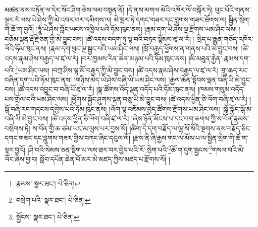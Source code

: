 མཚན་ནས་བཏོན་ལ་དེར་སོང་ཤིག་ཅེས་ལམ་བསྟན་ནོ། །དེ་ནས་མགལ་མེའི་འཁོར་ལོ་བསྐོར་ཏེ། ཕུང་པོའི་གནས་ལྔར་རཾ་ལས་ཡེ་ཤེས་ཀྱི་མེ་འབར་བར་དམིགས་ལ། མེ་སྦར་ཏེ་དགང་གཟར་དང་བླུགས་གཟར་ཐོགས་ལ། སྦྱིན་སྲེག་གི་ཆོ་ག་བྱའོ། །ཧཱུཾ་ཡེ་ཤེས་ཀློང་ཡངས་འཁྱིལ་པའི་ཧོམ་ཁུང་ནས། །རྣམ་དག་ཡེ་ཤེས་ལྔ་རྫོགས་ཡམ་ཤིང་ལས། །བཅོམ་ལྡན་རྡོ་རྗེ་ཅན་གྱི་མེ་བྱུང་བས། །ཚེ་འདས་བདག་ཏུ་ལྟ་བའི་བཏང་སྙོམས་ཛྭ་ལ་རཾ། །
སྲིད་པ་རྒྱུན་གཅོད་འཁོར་ལོའི་ཧོམ་ཁུང་ནས། །རྣམ་དག་ཕུང་ལྔ་སྦྱང་བའི་ཡམ་ཤིང་ལས། །ཁྲོ་བརྒྱད་ཕྱོགས་ན་གནས་པའི་མེ་བྱུང་བས། །ཚེ་འདས་རྣམ་ཤེས་བརྒྱད་ལ་ཛྭ་ལ་རཾ། །བར་ཁྱམས་རིན་ཆེན་མཉམ་པའི་ཧོམ་ཁུང་ནས། །མི་མཐུན་རྐྱེན་:རྣམས་དག་པའི་\footnote{རྣམས་  སྣར་ཐང་།  པེ་ཅིན། }ཡམ་ཤིང་ལས། །བཀྲ་ཤིས་ལྷ་མོ་བརྒྱད་ཀྱི་མེ་བྱུང་བས། །ཚེ་འདས་རྣམ་ཤེས་བརྒྱད་ལ་ཛྭ་ལ་རཾ། །གྲུ་ཆད་རང་བཞིན་དག་པའི་ཧོམ་ཁུང་ནས། །གཉིས་མེད་ཡེ་ཤེས་བཞི་ཡི་ཡམ་ཤིང་ལས། །རྒྱལ་ཆེན་སྟོབས་ལྡན་བཞི་ཡི་མེ་བྱུང་བས། །ཚེ་འདས་འབྱུང་བ་བཞི་པོ་ཛྭ་ལ་རཾ། །སྣ་ཚོགས་འོད་ལྡན་འདོད་པའི་ཧོམ་ཁུང་ནས། །ཁམས་གསུམ་འདོད་པས་གྲོལ་བའི་ཡམ་ཤིང་ལས། །ཕྱོགས་སྐྱོང་ཤུགས་ལྡན་བཅུ་ཡི་མེ་བྱུང་བས། །ཚེ་འདས་ཕྱིན་ཅི་ལོག་བཞི་ཛྭ་ལ་རཾ། །སྒོ་བཞི་རང་གདངས་དགྱེས་པའི་ཧོམ་ཁུང་ནས། །ལོག་ལྟ་འཇོམས་བྱེད་ཚོགས་རྫོགས་ཡམ་ཤིང་ལས། །སྒོ་སྐྱོང་སྒོ་མ་བཞི་ཡི་མེ་བྱུང་བས། །ཚེ་འདས་ཕྱིན་ཅི་ལོག་བཞི་ཛྭ་ལ་རཾ། །ཞེས་ཉོན་མོངས་པ་དང་བག་ཆགས་ཀྱི་ས་བོན་རྣམས་བསྲེགས་ཏེ། ས་བོན་གྱི་ཆ་ཙམ་ཡང་མ་ལུས་པར་བྱས་སོ། །ཚིག་དེ་དག་བརྗོད་ལ་ལྷ་སོ་སོའི་སྔགས་ནས་བརྗོད་ཅིང་དགང་གཟར་དང་བླུགས་གཟར་གྱིས་བཀང་ཞིང་དབུལ་ལོ། །རྫས་ནི་ཞི་རྒྱས་གང་ལ་མོས་པ་ལ་སྦྱིན་སྲེག་གི་ཆོ་ག་ལྟར་བྱའོ། །ཤི་བའི་སེམས་ཅན་སྡིག་པ་ལས་ཐར་བར་བྱེད་པའི་རོ་:སྲེག་པའི་\footnote{བསྲེག་པའི་  སྣར་ཐང་།  པེ་ཅིན། }ཆོ་ག་དུག་སྦྱངས་\footnote{སྦྱོངས་  སྣར་ཐང་།  པེ་ཅིན། }གསལ་བའི་མེ་ལོང་ཞེས་བྱ་བ། སློབ་དཔོན་ཆེན་པོ་མར་མེ་མཛད་ཀྱིས་མཛད་པ་རྫོགས་སོ། ། 